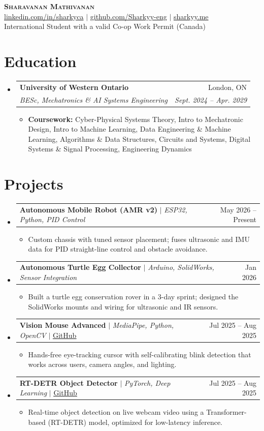\documentclass[letterpaper,9.5pt]{article}
\makeatletter
\newcommand{\resumeItem}[1]{
  \item\small{#1 \vspace{-1pt}}
}
\newcommand{\resumeSubheading}[4]{
  \vspace{-1pt}\item
    \begin{tabular*}{\textwidth}[t]{l@{\extracolsep{\fill}}r}
      \textbf{#1} & #2 \\
      \textit{\small#3} & \textit{\small #4} \\
    \end{tabular*}\vspace{-4pt}
}
\newcommand{\resumeProjectHeading}[2]{
    \item
    \begin{tabular*}{\textwidth}{l@{\extracolsep{\fill}}r}
      \small#1 & #2 \\
    \end{tabular*}\vspace{-4pt}
}
\newcommand{\resumeSubHeadingListStart}{\begin{itemize}[leftmargin=0.0in, label={}]}
\newcommand{\resumeSubHeadingListEnd}{\end{itemize}}
\newcommand{\resumeItemListStart}{\begin{itemize}[leftmargin=*,label=\textbullet,itemsep=-1pt,parsep=0pt,topsep=1pt]}
\newcommand{\resumeItemListEnd}{\end{itemize}\vspace{-4pt}}
\makeatother
\begin{document}
\begin{center}
    \textbf{\Huge \scshape Sharavanan Mathivanan} \\ \vspace{3pt}
    \small
    \href{https://www.linkedin.com/in/sharkyca}{linkedin.com/in/sharkyca} $|$
    \href{https://github.com/Sharkyy-eng}{github.com/Sharkyy-eng} $|$
    \href{https://sharkyy.me}{sharkyy.me} \\ \vspace{2pt}
    International Student with a valid Co-op Work Permit (Canada)
\end{center}

\section{Education}
  \resumeSubHeadingListStart
    \resumeSubheading
      {University of Western Ontario}{London, ON}
      {BESc, Mechatronics \& AI Systems Engineering}{Sept. 2024 -- Apr. 2029}
      \resumeItemListStart
        \resumeItem{\textbf{Coursework:} Cyber-Physical Systems Theory, Intro to Mechatronic Design, Intro to Machine Learning, Data Engineering \& Machine Learning, Algorithms \& Data Structures, Circuits and Systems, Digital Systems \& Signal Processing, Engineering Dynamics}
      \resumeItemListEnd
  \resumeSubHeadingListEnd

\section{Projects}
    \resumeSubHeadingListStart
      \resumeProjectHeading
          {\textbf{Autonomous Mobile Robot (AMR v2)} $|$ \emph{ESP32, Python, PID Control}}{May 2026 -- Present}
          \resumeItemListStart
            \resumeItem{Custom chassis with tuned sensor placement; fuses ultrasonic and IMU data for PID straight-line control and obstacle avoidance.}
          \resumeItemListEnd
      \resumeProjectHeading
          {\textbf{Autonomous Turtle Egg Collector} $|$ \emph{Arduino, SolidWorks, Sensor Integration}}{Jan 2026}
          \resumeItemListStart
            \resumeItem{Built a turtle egg conservation rover in a 3-day sprint; designed the SolidWorks mounts and wiring for ultrasonic and IR sensors.}
          \resumeItemListEnd
      \resumeProjectHeading
          {\textbf{Vision Mouse Advanced} $|$ \emph{MediaPipe, Python, OpenCV} $|$ \href{https://github.com/Sharkyy-eng/vision-mouse-advanced}{\underline{GitHub}}}{Jul 2025 -- Aug 2025}
          \resumeItemListStart
            \resumeItem{Hands-free eye-tracking cursor with self-calibrating blink detection that works across users, camera angles, and lighting.}
          \resumeItemListEnd
      \resumeProjectHeading
          {\textbf{RT-DETR Object Detector} $|$ \emph{PyTorch, Deep Learning} $|$ \href{https://github.com/Sharkyy-eng/rtdetr-object-detector}{\underline{GitHub}}}{Jul 2025 -- Aug 2025}
          \resumeItemListStart
            \resumeItem{Real-time object detection on live webcam video using a Transformer-based (RT-DETR) model, optimized for low-latency inference.}
          \resumeItemListEnd
    \resumeSubHeadingListEnd
\end{document}
